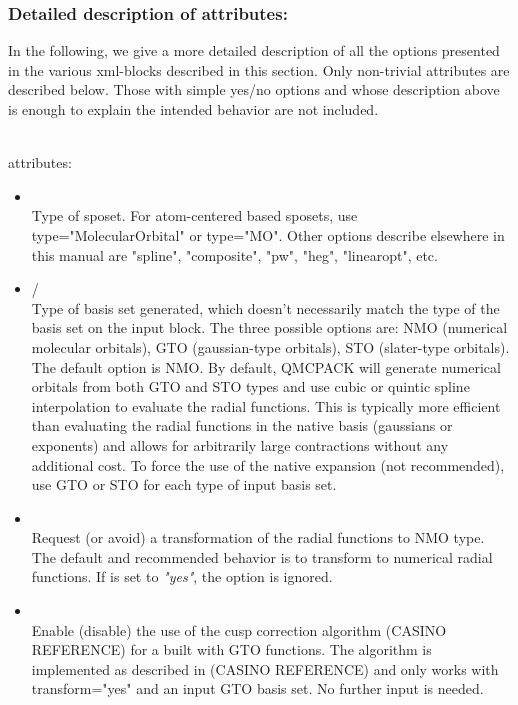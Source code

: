 \subsubsection{Detailed description of attributes:}

In the following, we give a more detailed description of all the options presented in the various xml-blocks described in this section. Only non-trivial attributes are described below. Those with simple yes/no options and whose description above is enough to explain the intended behavior are not included. 

\hspace{1mm} \\

 attributes:

\begin{itemize}
\item {} \\
Type of sposet. For atom-centered based sposets, use type="MolecularOrbital" or type="MO". Other options describe elsewhere in this manual are "spline", "composite", "pw", "heg", "linearopt", etc.
\item {}/ \\
Type of basis set generated, which doesn't necessarily match the type of the basis set on the input block. The three possible options are: NMO (numerical molecular orbitals), GTO (gaussian-type orbitals), STO (slater-type orbitals). The default option is NMO. By default, QMCPACK will generate numerical orbitals from both GTO and STO types and use cubic or quintic spline interpolation to evaluate the radial functions. This is typically more efficient than evaluating the radial functions in the native basis (gaussians or exponents) and allows for arbitrarily large contractions without any additional cost. To force the use of the native expansion (not recommended), use GTO or STO for each type of input basis set.
\item {}\\
Request (or avoid) a transformation of the radial functions to NMO type. The default and recommended behavior is to transform to numerical radial functions. If  is set to \textit{"yes"}, the option  is ignored.  
\item {}\\
Enable (disable) the use of the cusp correction algorithm (CASINO REFERENCE) for a  built with GTO functions. The algorithm is implemented as described in (CASINO REFERENCE) and only works with transform="yes" and an input GTO basis set. No further input is needed. 
\end{itemize}

